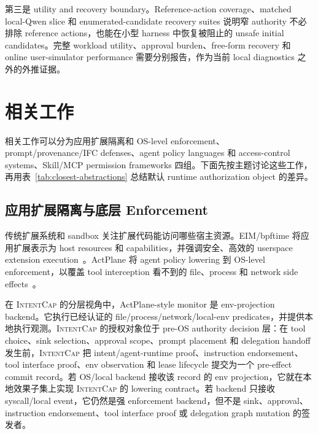 \documentclass[UTF8,a4paper,11pt]{ctexart}
\newcommand{\sys}{\textsc{IntentCap}\xspace}
\begin{document}
第三是 utility and recovery boundary。Reference-action coverage、matched local-Qwen slice 和 enumerated-candidate recovery suites 说明窄 authority 不必排除 reference actions，也能在小型 harness 中恢复被阻止的 unsafe initial candidates。完整 workload utility、approval burden、free-form recovery 和 online user-simulator performance 需要分别报告，作为当前 local diagnostics 之外的外推证据。

\section{相关工作}

相关工作可以分为应用扩展隔离和 OS-level enforcement、prompt/provenance/IFC defenses、agent policy languages 和 access-control systems、Skill/MCP permission frameworks 四组。下面先按主题讨论这些工作，再用表~\ref{tab:closest-abstractions} 总结默认 runtime authorization object 的差异。

\subsection{应用扩展隔离与底层 Enforcement}
传统扩展系统和 sandbox 关注扩展代码能访问哪些宿主资源。EIM/bpftime 将应用扩展表示为 host resources 和 capabilities，并强调安全、高效的 userspace extension execution~\cite{eim-bpftime}。ActPlane 将 agent policy lowering 到 OS-level enforcement，以覆盖 tool interception 看不到的 file、process 和 network side effects~\cite{actplane}。

在 \sys 的分层视角中，ActPlane-style monitor 是 env-projection backend。它执行已经认证的 file/process/network/local-env predicates，并提供本地执行观测。\sys 的授权对象位于 pre-OS authority decision 层：在 tool choice、sink selection、approval scope、prompt placement 和 delegation handoff 发生前，\sys 把 intent/agent-runtime proof、instruction endorsement、tool interface proof、env observation 和 lease lifecycle 提交为一个 pre-effect commit record。若 OS/local backend 接收该 record 的 env projection，它就在本地效果子集上实现 \sys 的 lowering contract。若 backend 只接收 syscall/local event，它仍然是强 enforcement backend，但不是 sink、approval、instruction endorsement、tool interface proof 或 delegation graph mutation 的签发者。
\end{document}
